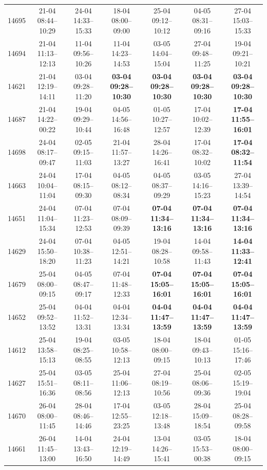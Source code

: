 \begin{table}[htbp]
\begin{tabular}{|r|c|c|c|c|c|c|}
14695 & 21-04 08:44--10:29 & 24-04 14:33--15:33 & 18-04 08:00--09:00 & 25-04 09:12--10:12 & 04-05 08:31--09:16 & 27-04 15:03--15:33 \\ 
14694 & 21-04 11:13--12:13 & 11-04 09:56--10:26 & 11-04 14:23--14:53 & 03-05 14:04--15:04 & 27-04 09:48--11:25 & 19-04 09:21--10:21 \\ 
14621 & 21-04 12:19--14:11 & 03-04 09:28--11:20 & \textbf{03-04 09:28--10:30} & \textbf{03-04 09:28--10:30} & \textbf{03-04 09:28--10:30} & \textbf{03-04 09:28--10:30} \\ 
14687 & 21-04 14:22--00:22 & 19-04 09:29--10:44 & 04-05 14:56--16:48 & 01-05 10:27--12:57 & 17-04 10:02--12:39 & \textbf{17-04 11:55--16:01} \\ 
14698 & 24-04 08:17--09:47 & 02-05 09:15--11:03 & 21-04 11:57--13:27 & 28-04 14:26--16:41 & 17-04 08:32--10:02 & \textbf{17-04 08:32--11:54} \\ 
14663 & 24-04 10:04--11:04 & 17-04 08:15--09:30 & 04-05 08:12--08:34 & 04-05 08:37--09:29 & 03-05 14:16--15:23 & 27-04 13:39--14:54 \\ 
14651 & 24-04 11:04--15:34 & 07-04 11:23--12:53 & 07-04 08:09--09:39 & \textbf{07-04 11:34--13:16} & \textbf{07-04 11:34--13:16} & \textbf{07-04 11:34--13:16} \\ 
14629 & 24-04 15:50--18:20 & 07-04 10:38--11:23 & 04-05 12:51--14:21 & 19-04 08:28--10:58 & 14-04 09:58--11:43 & \textbf{14-04 11:33--12:41} \\ 
14679 & 25-04 08:00--09:15 & 04-05 08:47--09:17 & 07-04 11:48--12:33 & \textbf{07-04 15:05--16:01} & \textbf{07-04 15:05--16:01} & \textbf{07-04 15:05--16:01} \\ 
14652 & 25-04 09:52--13:52 & 04-04 11:52--13:31 & 04-04 12:34--13:34 & \textbf{04-04 11:47--13:59} & \textbf{04-04 11:47--13:59} & \textbf{04-04 11:47--13:59} \\ 
14612 & 25-04 13:58--15:13 & 19-04 08:25--08:55 & 03-05 10:58--12:13 & 18-04 08:00--09:15 & 18-04 09:43--10:13 & 01-05 15:16--17:46 \\ 
14627 & 25-04 15:51--16:36 & 03-05 08:11--08:56 & 25-04 11:06--12:13 & 27-04 08:19--10:56 & 25-04 08:06--09:36 & 02-05 15:19--19:04 \\ 
14670 & 26-04 08:00--11:45 & 28-04 08:46--14:46 & 17-04 12:55--23:25 & 03-05 12:18--13:48 & 28-04 15:09--18:54 & 25-04 08:28--09:58 \\ 
14661 & 26-04 11:45--13:00 & 14-04 13:43--16:50 & 24-04 12:19--14:49 & 13-04 14:26--15:41 & 03-05 15:53--00:38 & 18-04 08:00--09:15 \\ 

\end{tabular}
\end{table}
